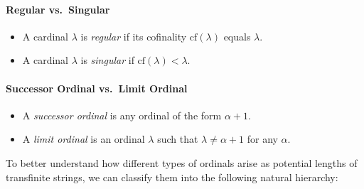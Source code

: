 \paragraph{Regular vs.\ Singular}

\begin{itemize}
  \item A cardinal $\lambda$ is \emph{regular} if its cofinality $\mathrm{cf}(\lambda)$ equals $\lambda$.
  \item A cardinal $\lambda$ is \emph{singular} if $\mathrm{cf}(\lambda) < \lambda$.
\end{itemize}

\paragraph{Successor Ordinal vs.\ Limit Ordinal}

\begin{itemize}
  \item A \emph{successor ordinal} is any ordinal of the form $\alpha + 1$.
  \item A \emph{limit ordinal} is an ordinal $\lambda$ such that $\lambda \neq \alpha + 1$ for any $\alpha$.
\end{itemize}

To better understand how different types of ordinals arise as potential lengths of transfinite strings, we can classify them into the following natural hierarchy:

